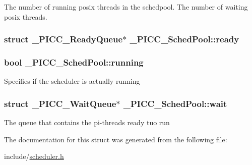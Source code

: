 The number of running posix threads in the schedpool. The number of waiting posix threads. \hypertarget{struct__PICC__SchedPool_ac631e8875659f9413be6c744a4612c3a}{
\subsubsection[{ready}]{\setlength{\rightskip}{0pt plus 5cm}struct {\bf \-\_\-\-P\-I\-C\-C\-\_\-\-Ready\-Queue}$\ast$ \-\_\-\-P\-I\-C\-C\-\_\-\-Sched\-Pool\-::ready}}\label{struct__PICC__SchedPool_ac631e8875659f9413be6c744a4612c3a}
\hypertarget{struct__PICC__SchedPool_ae86d4523d59cb922e141d536d7f9efd5}{
\subsubsection[{running}]{\setlength{\rightskip}{0pt plus 5cm}bool \-\_\-\-P\-I\-C\-C\-\_\-\-Sched\-Pool\-::running}}\label{struct__PICC__SchedPool_ae86d4523d59cb922e141d536d7f9efd5}
Specifies if the scheduler is actually running \hypertarget{struct__PICC__SchedPool_aecc100746299a575ead9e5e43bede174}{
\subsubsection[{wait}]{\setlength{\rightskip}{0pt plus 5cm}struct {\bf \-\_\-\-P\-I\-C\-C\-\_\-\-Wait\-Queue}$\ast$ \-\_\-\-P\-I\-C\-C\-\_\-\-Sched\-Pool\-::wait}}\label{struct__PICC__SchedPool_aecc100746299a575ead9e5e43bede174}
The queue that contains the pi-\/threads ready tuo run 

The documentation for this struct was generated from the following file\-:\begin{DoxyCompactItemize}
\item 
include/\hyperlink{scheduler_8h}{scheduler.\-h}\end{DoxyCompactItemize}
